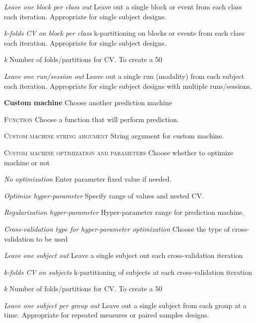 \textit{Leave one block per class out}
Leave out a single block or event from each class each iteration. Appropriate for single subject designs.


\textit{k-folds CV on block per class}
k-partitioning on blocks or events from each class each iteration. Appropriate for single subject designs.


\textit{k}
Number of folds/partitions for CV. To create a 50%


\textit{Leave one run/session out}
Leave out a single run (modality) from each subject each iteration. Appropriate for single subject designs with multiple runs/sessions.


\textbf{Custom machine}
Choose another prediction machine


\textsc{Function}
Choose a function that will perform prediction.


\textsc{Custom machine string argument}
String argument for custom machine.


\textsc{Custom machine optimization and parameters}
Choose whether to optimize machine or not


\textsl{No optimization}
Enter parameter fixed value if needed.


\textsl{Optimize hyper-parameter}
Specify range of values and nested CV.


\textit{Regularization hyper-parameter}
Hyper-parameter range for prediction machine.


\textit{Cross-validation type for hyper-parameter optimization}
Choose the type of cross-validation to be used


\textit{Leave one subject out}
Leave a single subject out each cross-validation iteration


\textit{k-folds CV on subjects}
k-partitioning of subjects at each cross-validation iteration


\textit{k}
Number of folds/partitions for CV. To create a 50%


\textit{Leave one subject per group out}
Leave out a single subject from each group at a time. Appropriate for repeated measures or paired samples designs.


